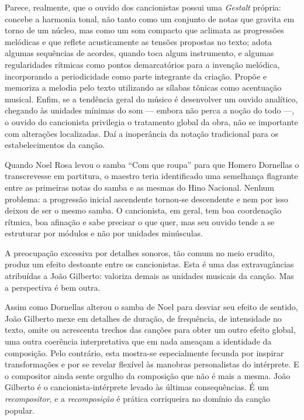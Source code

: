 Parece, realmente, que o ouvido dos cancionistas possui uma \textit{Gestalt}
própria: concebe a harmonia tonal, não tanto como um conjunto de notas
que gravita em torno de um núcleo, mas como um som compacto que aclimata
as progressões melódicas e que reflete acusticamente as tensões
propostas no texto; adota algumas sequências de acordes, quando toca
algum instrumento, e algumas regularidades rítmicas como pontos
demarcatórios para a invenção melódica, incorporando a periodicidade
como parte integrante da criação. Propõe e memoriza a melodia pelo texto
utilizando as sílabas tônicas como acentuação musical. Enfim, se a
tendência geral do músico é desenvolver um ouvido analítico, chegando às
unidades mínimas do som --- embora não perca a noção do todo ---, o ouvido do
cancionista privilegia o tratamento global da obra, não se importante
com alterações localizadas. Daí a inoperância da notação tradicional
para os estabelecimentos da canção.

Quando Noel Rosa levou o samba ``Com que roupa'' para que Homero Dornellas o
transcrevesse em partitura, o maestro teria identificado uma semelhança
flagrante entre as primeiras notas do samba e as mesmas do Hino
Nacional. Nenhum problema: a progressão inicial ascendente tornou-se
descendente e nem por isso deixou de ser o mesmo samba. O cancionista,
em geral, tem boa coordenação rítmica, boa afinação e sabe precisar o
que quer, mas seu ouvido tende a se estruturar por módulos e não por
unidades minúsculas.

A preocupação excessiva por detalhes sonoros, tão comum no meio erudito,
produz um efeito destoante entre os cancionistas. Esta é uma das
extravagâncias atribuídas a João Gilberto: valoriza demais as unidades
musicais da canção. Mas a perspectiva é bem outra.

Assim como Dornellas alterou o samba de Noel para desviar seu efeito de
sentido, João Gilberto mexe em detalhes de duração, de frequência, de
intensidade no texto, omite ou acrescenta trechos das canções
para obter um outro efeito global, uma outra coerência interpretativa
que em nada ameaçam a identidade da composição. Pelo contrário, esta
mostra-se especialmente fecunda por inspirar transformações e por se
revelar flexível às manobras personalistas do intérprete. E o compositor
ainda sente orgulho da composição que não é mais a mesma. João Gilberto
é o cancionista-intérprete levado às últimas consequências. É um
\textit{recompositor}, e a \textit{recomposição} é prática corriqueira no domínio da
canção popular.

